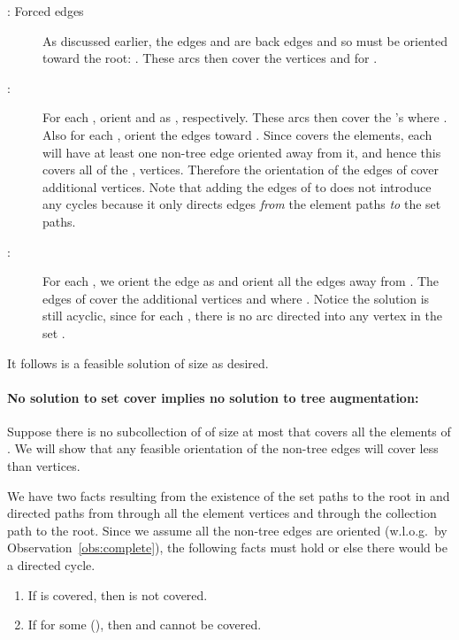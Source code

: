 \documentclass{article}
\begin{document}
\begin{description}
\item[: Forced edges] 
	As discussed earlier, the edges  and  are back edges and so must be oriented toward the root: .  	These arcs then cover the  vertices  and  for
	.

\item[: ] 
	For each , orient  and  as ,  respectively. These arcs then cover the  's where .
	Also for each , orient the edges  toward .  
	Since  covers the elements, each  will have at least one non-tree edge oriented away from it, and hence this covers all of the ,  vertices.
	Therefore the orientation of the edges of  cover  additional vertices. 	
	Note that adding the edges of  to  does not introduce any cycles because it only directs edges {\em from} the element paths {\em to} the set paths.
	
\item[: ] 
	For each , we orient the edge  as  and orient all the edges  away from .  
	The edges of  cover the  additional vertices  and  where . 
	Notice the solution is still acyclic, since for each , there is no arc directed into any vertex in the set .
	
\end{description}
It follows  is a feasible solution of size  as desired.  

\paragraph{No solution to {\sc set cover} implies no solution to
  {\sc tree augmentation}:}
Suppose there is no subcollection of  of size at most  that
covers all the elements of .  We will show that any feasible orientation of
the non-tree edges
 will cover less than  vertices.

We have two facts resulting from the existence of the set paths to the
root in  and directed paths from  through
all the element vertices and through the collection path to the root.
Since we assume all the non-tree edges are oriented (w.l.o.g.\ by
Observation~\ref{obs:complete}), the following facts must hold or else
there would be a directed cycle.
\begin{enumerate}[{Fact} 1]
\item If  is covered, then  is not covered. \label{fact1}

\item If  for some
   (), then  and  cannot be covered. \label{fact2}
\end{enumerate}
\end{document}
